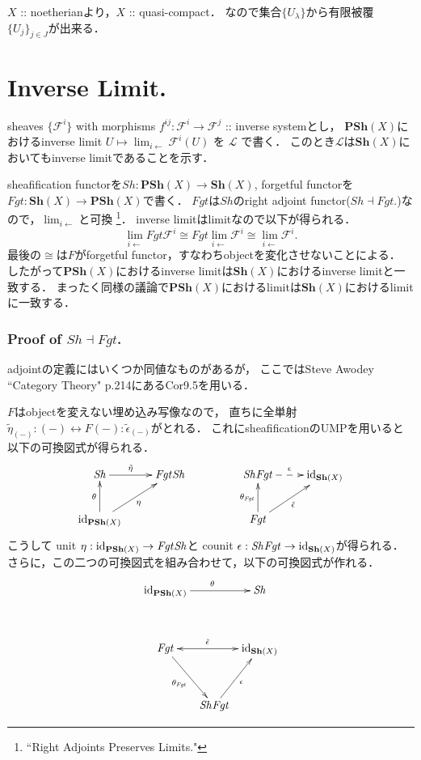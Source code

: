 \documentclass[a4paper]{jsarticle}
\newcommand{\shF}{\mathcal{F}}
\newcommand{\shL}{\mathcal{L}}
\newcommand{\Sh}{\mathbf{Sh}}
\newcommand{\PSh}{\mathbf{PSh}}
\newcommand{\ftorSh}{\mathit{Sh}}
\newcommand{\ftorFgt}{\mathit{Fgt}}
\begin{document}
    $X$ :: noetherianより，$X$ :: quasi-compact．
    なので集合$\{U_{\lambda}\}$から有限被覆$\{ U_j \}_{j \in J}$が出来る．

\section{Inverse Limit.} %
    sheaves $\{\shF^i\}$ with morphisms $f^{ij}: \shF^i \to \shF^j$ :: inverse systemとし，
    $\PSh(X)$におけるinverse limit $U \mapsto \lim_{i \leftarrow} \shF^i(U)$ を $\shL$ で書く．
    このとき$\shL$は$\Sh(X)$においてもinverse limitであることを示す．
    
    sheafification functorを$\ftorSh: \PSh(X) \to \Sh(X)$, 
    forgetful functorを$\ftorFgt: \Sh(X) \to \PSh(X)$で書く．
    $\ftorFgt$は$\ftorSh$のright adjoint functor($\ftorSh \dashv \ftorFgt$.)なので，$\lim_{i \leftarrow}$と可換
    \footnote{``Right Adjoints Preserves Limits."}．
    inverse limitはlimitなので以下が得られる．
    \[ \lim_{i \leftarrow} \ftorFgt \shF^i \cong \ftorFgt \lim_{i \leftarrow} \shF^i \cong \lim_{i \leftarrow} \shF^i. \]
    最後の$\cong$は$F$がforgetful functor，すなわちobjectを変化させないことによる．
    したがって$\PSh(X)$におけるinverse limitは$\Sh(X)$におけるinverse limitと一致する．
    まったく同様の議論で$\PSh(X)$におけるlimitは$\Sh(X)$におけるlimitに一致する．

    \subsubsection{Proof of $\ftorSh \dashv \ftorFgt$.}
    adjointの定義にはいくつか同値なものがあるが，
    ここではSteve Awodey ``Category Theory" p.214にあるCor9.5を用いる．

    $F$はobjectを変えない埋め込み写像なので，
    直ちに全単射$\tilde{\eta}_{(-)}: (-) \leftrightarrow F(-):\tilde{\epsilon}_{(-)}$がとれる．
    これにsheafificationのUMPを用いると以下の可換図式が得られる．
    \[
    \xymatrix
    {
    \ftorSh \ar@{->}[r]^-{\tilde{\eta}_{}}& \ftorFgt \ftorSh\\
    \id{\PSh(X)} \ar[ru]_-{\eta} \ar[u]^-{\theta}& {}
    }
    \hspace{15mm}
    \xymatrix
    {
    \ftorSh \ftorFgt \ar@{-->}[r]^-{\epsilon_{}}& \id{\Sh(X)}\\
    \ftorFgt \ar[ru]_-{\tilde{\epsilon}_{}} \ar[u]^-{\theta_{\ftorFgt}}& {}
    }
    \]
    こうして
    unit $\eta: \id{\PSh(X)} \to \ftorFgt \ftorSh$と
    counit $\epsilon: \ftorSh \ftorFgt \to \id{\Sh(X)}$が得られる．
    さらに，この二つの可換図式を組み合わせて，以下の可換図式が作れる．
    \[
    \xymatrix@C=5pt@R=35pt
    {
    \id{\PSh(X)} \ar[rr]^{\theta_{}} & {} & \ftorSh  \\
    \ftorFgt \ar@{<->}[rr]^-{\tilde{\epsilon}_{}} \ar[rd]_-{\theta_{\ftorFgt}} & {} & \id{\Sh(X)} \\
    {} & \ftorSh \ftorFgt \ar[ru]_-{\epsilon_{}} & {}
    }
    \]
\end{document}

